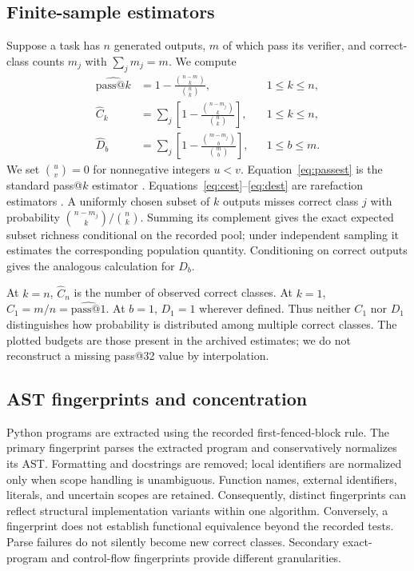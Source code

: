 \documentclass{article}
\begin{document}
\subsection{Finite-sample estimators}
Suppose a task has $n$ generated outputs, $m$ of which pass its verifier, and correct-class counts $m_j$ with $\sum_jm_j=m$. We compute
\begin{align}
\widehat{\mathrm{pass@}k}&=1-\frac{\binom{n-m}{k}}{\binom nk}, &&1\le k\le n,\label{eq:passest}\\
\widehat C_k&=\sum_j\left[1-\frac{\binom{n-m_j}{k}}{\binom nk}\right], &&1\le k\le n,\label{eq:cest}\\
\widehat D_b&=\sum_j\left[1-\frac{\binom{m-m_j}{b}}{\binom mb}\right], &&1\le b\le m.\label{eq:dest}
\end{align}
We set $\binom uv=0$ for nonnegative integers $u<v$. Equation~\eqref{eq:passest} is the standard pass@$k$ estimator \citep{chen2021humaneval}. Equations~\eqref{eq:cest}--\eqref{eq:dest} are rarefaction estimators \citep{hurlbert1971nonconcept}. A uniformly chosen subset of $k$ outputs misses correct class $j$ with probability $\binom{n-m_j}{k}/\binom nk$. Summing its complement gives the exact expected subset richness conditional on the recorded pool; under independent sampling it estimates the corresponding population quantity. Conditioning on correct outputs gives the analogous calculation for $D_b$.

At $k=n$, $\widehat C_n$ is the number of observed correct classes. At $k=1$, $\widehat C_1=m/n=\widehat{\mathrm{pass@}1}$. At $b=1$, $D_1=1$ wherever defined. Thus neither $C_1$ nor $D_1$ distinguishes how probability is distributed among multiple correct classes. The plotted budgets are those present in the archived estimates; we do not reconstruct a missing pass@32 value by interpolation.

\subsection{AST fingerprints and concentration}
Python programs are extracted using the recorded first-fenced-block rule. The primary fingerprint parses the extracted program and conservatively normalizes its AST. Formatting and docstrings are removed; local identifiers are normalized only when scope handling is unambiguous. Function names, external identifiers, literals, and uncertain scopes are retained. Consequently, distinct fingerprints can reflect structural implementation variants within one algorithm. Conversely, a fingerprint does not establish functional equivalence beyond the recorded tests. Parse failures do not silently become new correct classes. Secondary exact-program and control-flow fingerprints provide different granularities.
\end{document}

